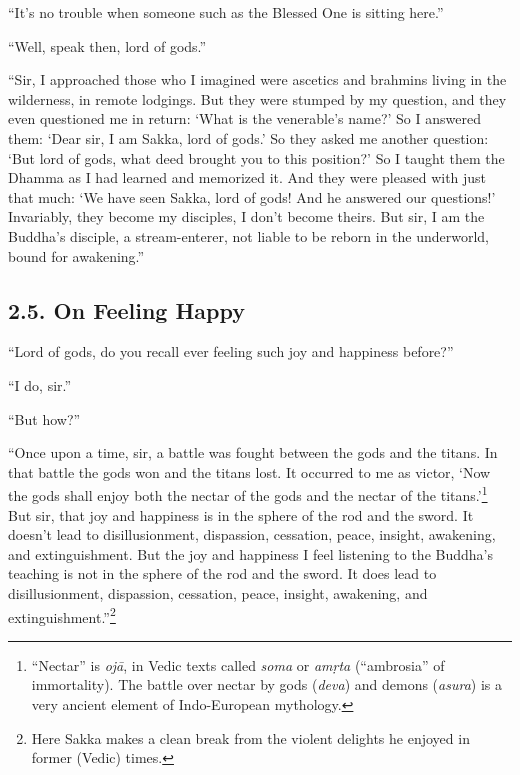 \documentclass[12pt,openany]{book}%
\begin{document}
“It’s no trouble when someone such as the Blessed One is sitting here.” 

“Well, speak then, lord of gods.” 

“Sir, I approached those who I imagined were ascetics and brahmins living in the wilderness, in remote lodgings. But they were stumped by my question, and they even questioned me in return: ‘What is the venerable’s name?’ So I answered them: ‘Dear sir, I am Sakka, lord of gods.’ So they asked me another question: ‘But lord of gods, what deed brought you to this position?’ So I taught them the Dhamma as I had learned and memorized it. And they were pleased with just that much: ‘We have seen Sakka, lord of gods! And he answered our questions!’ Invariably, they become my disciples, I don’t become theirs. But sir, I am the Buddha’s disciple, a stream-enterer, not liable to be reborn in the underworld, bound for awakening.” 

\subsection*{2.5. On Feeling Happy }

“Lord of gods, do you recall ever feeling such joy and happiness before?” 

“I do, sir.” 

“But how?” 

“Once upon a time, sir, a battle was fought between the gods and the titans. In that battle the gods won and the titans lost. It occurred to me as victor, ‘Now the gods shall enjoy both the nectar of the gods and the nectar of the titans.’\footnote{“Nectar” is \textit{\textsanskrit{ojā}}, in Vedic texts called \textit{soma} or \textit{\textsanskrit{amṛta}} (“ambrosia” of immortality). The battle over nectar by gods (\textit{deva}) and demons (\textit{asura}) is a very ancient element of Indo-European mythology. } But sir, that joy and happiness is in the sphere of the rod and the sword. It doesn’t lead to disillusionment, dispassion, cessation, peace, insight, awakening, and extinguishment. But the joy and happiness I feel listening to the Buddha’s teaching is not in the sphere of the rod and the sword. It does lead to disillusionment, dispassion, cessation, peace, insight, awakening, and extinguishment.”\footnote{Here Sakka makes a clean break from the violent delights he enjoyed in former (Vedic) times. } 
\end{document}
